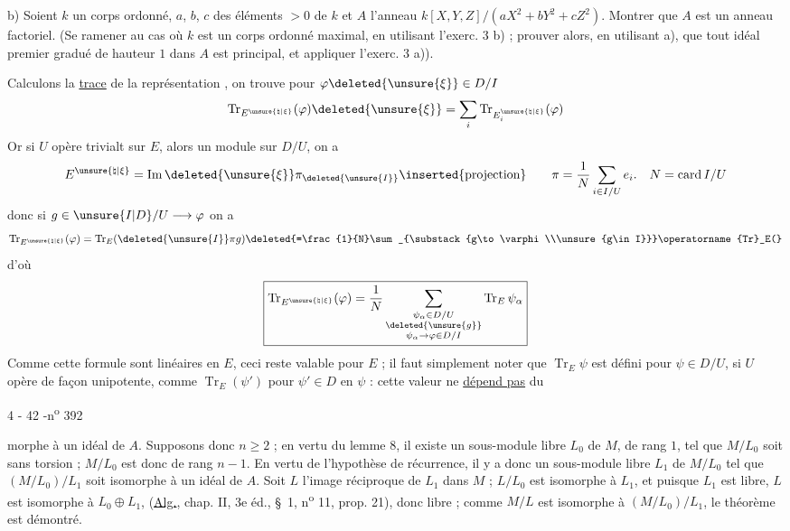 b) Soient $k$ un corps ordonné, $a$, $b$, $c$ des éléments $>0$ de $k$ et $A$ l'anneau $k[X,Y,Z]/(aX^2+bY^2+cZ^2)$. Montrer que $A$ est un anneau factoriel. (Se ramener au cas où $k$ est un corps ordonné maximal, en utilisant l'exerc. 3 b) ; prouver alors, en utilisant a), que tout idéal premier gradué de hauteur $1$ dans $A$ est principal, et appliquer l'exerc. 3 a)).


Calculons la \uline{trace} de la représentation , on trouve pour $\varphi\deleted{\unsure{\xi}}\in D/I$
\[
\operatorname{Tr}_{E^{\unsure{\natural|\xi}}}(\varphi)\deleted{\unsure{\xi}}=\sum_i\operatorname{Tr}_{E_i^{\unsure{\natural|\xi}}}(\varphi)
\]
Or si  $U$ opère trivialt sur $E$,  alors un module sur $D/U$, on a
\[
E^{\unsure{\natural|\xi}}=\operatorname{Im}\deleted{\unsure{\xi}}\pi_{\deleted{\unsure{I}}}\inserted{\text{projection}}\qquad
\pi=\frac{1}{N}\sum_{i\in I/U}e_i.\quad N=\operatorname{card} I/U
\]
donc si $g\in\unsure{I|D}/U\longrightarrow\varphi$ on a
\[
\operatorname{Tr}_{E^{\unsure{\natural|\xi}}}(\varphi)=\operatorname{Tr}_E(\deleted{\unsure{I}}\pi g)\deleted{=\frac{1}{N}\sum_{\substack{g\to\varphi\\\unsure{g\in I}}}\operatorname{Tr}_E(}
\]
d'où
\[
\boxed{\operatorname{Tr}_{E^{\unsure{\natural|\xi}}}(\varphi)=\frac{1}{N}\sum_{\substack{\psi_\alpha\in D/U\\\deleted{\unsure{g}}\\\psi_\alpha\to\varphi\in D/I}}\operatorname{Tr}_E\psi_\alpha}
\]
Comme  cette formule sont linéaires en $E$, ceci reste valable pour  $E$ ; il faut simplement noter que $\operatorname{Tr}_E\psi$ est défini  pour $\psi\in D/U$, si $U$ opère de façon unipotente, comme $\operatorname{Tr}_E(\psi')$ pour $\psi'\in D$  en $\psi$ : cette valeur ne \uline{dépend pas} du


\begin{center}4 - 42 -\hfill n\textsuperscript{o} 392\end{center}

morphe à un idéal de $A$. Supposons donc $n\geq 2$ ; en vertu du lemme 8, il existe un sous-module libre $L_0$ de $M$, de rang $1$, tel que $M/L_0$ soit sans torsion ; $M/L_0$ est donc de rang $n-1$. En vertu de l'hypothèse de récurrence, il y a donc un sous-module libre $L_1$ de $M/L_0$ tel que $(M/L_0)/L_1$ soit isomorphe à un idéal de $A$. Soit $L$ l'image réciproque de $L_1$ dans $M$ ; $L/L_0$ est isomorphe à $L_1$, et puisque $L_1$ est libre, $L$ est isomorphe à $L_0\oplus L_1$, (\uline{Alg.}, chap. II, 3e éd., \S\ 1, n\textsuperscript{o} 11, prop. 21), donc libre ; comme $M/L$ est isomorphe à $(M/L_0)/L_1$, le théorème est démontré.

